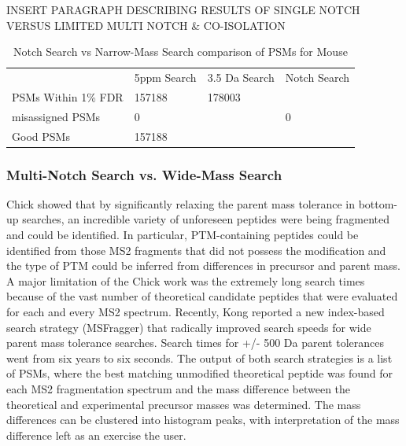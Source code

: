 \documentclass[journal=jprobs,manuscript=article]{achemso}
\begin{document}
INSERT PARAGRAPH DESCRIBING RESULTS OF SINGLE NOTCH VERSUS LIMITED MULTI NOTCH \& CO-ISOLATION

\begin{table}[]
\centering
\caption{Notch Search vs Narrow-Mass Search comparison of PSMs for Mouse}
\label{my-label}
\begin{tabular}{llll}
                    & 5ppm Search & 3.5 Da Search & Notch Search \\
PSMs Within 1\% FDR & 157188      & 178003        &        \\
misassigned PSMs    & 0           &               & 0            \\
Good PSMs           & 157188      &         &        \\ 
\end{tabular}
\end{table}



\subsubsection{Multi-Notch Search vs. Wide-Mass Search}

Chick\citep{Chick_2015} showed that by significantly relaxing the parent mass tolerance in bottom-up searches, an incredible variety of unforeseen peptides were being fragmented and could be identified.
In particular, PTM-containing peptides could be identified from those MS2 fragments that did not possess the modification and the type of PTM could be inferred from differences in precursor and parent mass.
A major limitation of the Chick work was the extremely long search times because of the vast number of theoretical candidate peptides that were evaluated for each and every MS2 spectrum.
Recently, Kong\citep{Kong_2017} reported a new index-based search strategy (MSFragger) that radically improved search speeds for wide parent mass tolerance searches.
Search times for +/- 500 Da parent tolerances went from six years to six seconds.
The output of both search strategies is a list of PSMs, where the best matching unmodified theoretical peptide was found for each MS2 fragmentation spectrum and the mass difference between the theoretical and experimental precursor masses was determined.
The mass differences can be clustered into histogram peaks\citep{Rodriguez_2014}, with interpretation of the mass difference left as an exercise the user.
\end{document}
